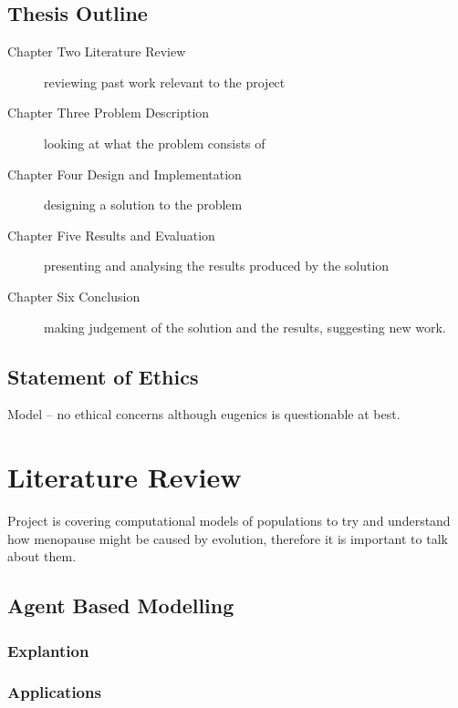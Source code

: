 \documentclass[authoryearcitations]{UoYCSproject}
\begin{document}
\section{Thesis Outline}
\begin{description}

\item[Chapter Two Literature Review] reviewing past work relevant to the project

\item[Chapter Three Problem Description] looking at what the problem consists of

\item[Chapter Four Design and Implementation] designing a solution to the problem

\item[Chapter Five Results and Evaluation] presenting and analysing the results produced by the solution

\item[Chapter Six Conclusion] making judgement of the solution and the results, suggesting new work.

\end{description}

\section{Statement of Ethics}
Model -- no ethical concerns although eugenics is questionable at best.

\chapter{Literature Review}
\label{cha:Literature Review}
Project is covering computational models of populations to try and understand how menopause might be caused by evolution, therefore it is important to talk about them.

\section{Agent Based Modelling}

\subsection{Explantion}

\subsection{Applications}
\end{document}

